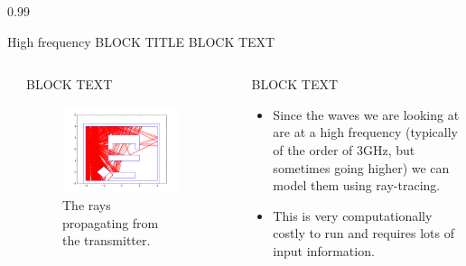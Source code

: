 \documentclass[final]{beamer}
\theoremstyle{plain}
\theoremstyle{definition}
\theoremstyle{remark}
\newlength{\twocolwid}
\begin{document}
\begin{frame}[t]
\begin{columns}[t]
\begin{column}{0.99\twocolwid}
\begin{alertblock}{High frequency BLOCK TITLE
}
BLOCK TEXT
\begin{columns}
\begin{column}{0.05\linewidth}
\end{column}
\begin{column}{0.45\linewidth}
BLOCK TEXT
\begin{figure}[H]
\includegraphics[scale=0.8]{MultiRay.jpg} 
\caption{The rays propagating from the transmitter.
}
\end{figure}
\end{column}
\begin{column}{0.05\linewidth}
\end{column}
\begin{column}{0.45\linewidth}
BLOCK TEXT
\begin{itemize}
\item
Since the waves we are looking at are at a high frequency (typically of the order of 3GHz, but sometimes going higher)  we can model them using ray-tracing.
\item This is very computationally costly to run and requires lots of input information.
\end{itemize}
\end{column}
\end{columns}


\end{alertblock}
\end{column}
\end{columns}
\end{frame}
\end{document}
